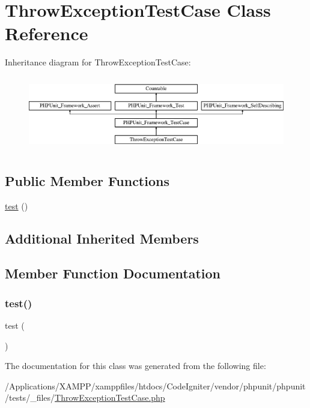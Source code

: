 \hypertarget{class_throw_exception_test_case}{}\section{Throw\+Exception\+Test\+Case Class Reference}
\label{class_throw_exception_test_case}
Inheritance diagram for Throw\+Exception\+Test\+Case\+:\begin{figure}[H]
\begin{center}
\leavevmode
\includegraphics[height=3.303835cm]{class_throw_exception_test_case}
\end{center}
\end{figure}
\subsection*{Public Member Functions}
\begin{DoxyCompactItemize}
\item 
\mbox{\hyperlink{class_throw_exception_test_case_ad69dd4607977cae05ebe19d1ae604fb1}{test}} ()
\end{DoxyCompactItemize}
\subsection*{Additional Inherited Members}


\subsection{Member Function Documentation}
\mbox{\label{class_throw_exception_test_case_ad69dd4607977cae05ebe19d1ae604fb1}} 
\subsubsection{\texorpdfstring{test()}{test()}}
{\footnotesize\ttfamily test (\begin{DoxyParamCaption}{ }\end{DoxyParamCaption})}



The documentation for this class was generated from the following file\+:\begin{DoxyCompactItemize}
\item 
/\+Applications/\+X\+A\+M\+P\+P/xamppfiles/htdocs/\+Code\+Igniter/vendor/phpunit/phpunit/tests/\+\_\+files/\mbox{\hyperlink{_throw_exception_test_case_8php}{Throw\+Exception\+Test\+Case.\+php}}\end{DoxyCompactItemize}
